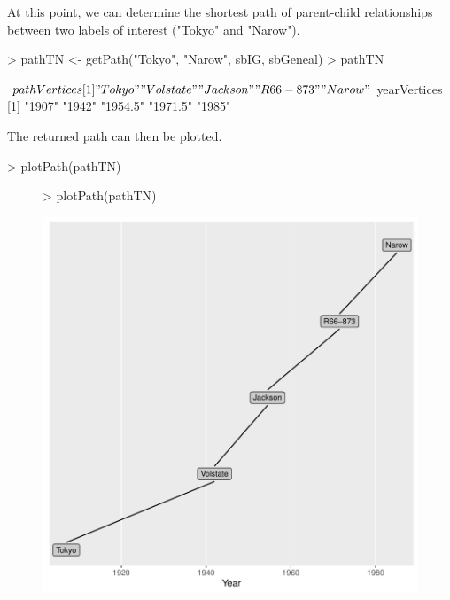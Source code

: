 \documentclass{article}
\begin{document}
At this point, we can determine the shortest path of parent-child relationships between two labels of interest ("Tokyo" and "Narow").

\begin{Schunk}
\begin{Sinput}
> pathTN <- getPath("Tokyo", "Narow", sbIG, sbGeneal)
> pathTN
\end{Sinput}
\begin{Soutput}
$pathVertices
[1] "Tokyo"    "Volstate" "Jackson"  "R66-873"  "Narow"   

$yearVertices
[1] "1907"   "1942"   "1954.5" "1971.5" "1985"  
\end{Soutput}
\end{Schunk}

The returned path can then be plotted.

\begin{Schunk}
\begin{Sinput}
> plotPath(pathTN)
\end{Sinput}
\end{Schunk}

\begin{figure}[H]
\centering
\begin{Schunk}
\begin{Sinput}
> plotPath(pathTN)
\end{Sinput}
\end{Schunk}
\includegraphics{replicationScript-008}
\end{figure}
\end{document}
